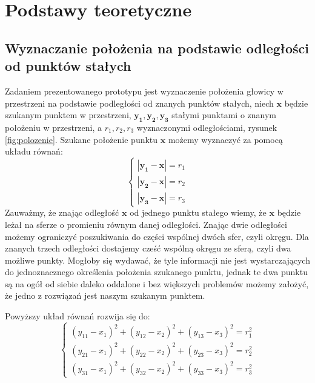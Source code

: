 \chapter{Podstawy teoretyczne}
\section{Wyznaczanie położenia na podstawie odległości od punktów stałych}

Zadaniem prezentowanego prototypu jest wyznaczenie położenia głowicy w przestrzeni na podstawie
podległości od znanych punktów stałych, niech $\boldsymbol{x}$ będzie szukanym punktem w przestrzeni,
$\boldsymbol{y_1,y_2,y_3}$ stałymi punktami o znanym położeniu w przestrzeni, a $r_1,r_2,r_3$ wyznaczonymi odległościami, 
rysunek \ref{fig:polozenie}. Szukane położenie punktu $\boldsymbol{x}$ możemy wyznaczyć za pomocą układu równań:
\[
 \begin{cases}
    |\boldsymbol{y_1} - \boldsymbol{x}| = r_1
 \\ |\boldsymbol{y_2} - \boldsymbol{x}| = r_2
 \\ |\boldsymbol{y_3} - \boldsymbol{x}| = r_3
 \end{cases}
\]
Zauważmy, że znając odległość $\boldsymbol{x}$ od jednego punktu stałego wiemy, że $\boldsymbol{x}$ będzie leżał na
sferze o promieniu równym danej odległości. Znając dwie odległości możemy ograniczyć poszukiwania do części wspólnej dwóch sfer,
czyli okręgu. Dla znanych trzech odległości dostajemy cześć wspólną okręgu ze sferą, czyli dwa możliwe punkty.
Mogłoby się wydawać, że tyle informacji nie jest wystarczających do jednoznacznego określenia położenia
szukanego punktu, jednak te dwa punktu są na ogół od siebie daleko oddalone i bez większych problemów
możemy założyć, że jedno z rozwiązań jest naszym szukanym punktem.


Powyższy układ równań rozwija się do:
\[
 \begin{cases}
     (y_{11}-x_1)^2 + (y_{12}-x_2)^2 + (y_{13}-x_3)^2 = r_1^2
 \\  (y_{21}-x_1)^2 + (y_{22}-x_2)^2 + (y_{23}-x_3)^2 = r_2^2
 \\  (y_{31}-x_1)^2 + (y_{32}-x_2)^2 + (y_{33}-x_3)^2 = r_3^2
 \end{cases}
\]

